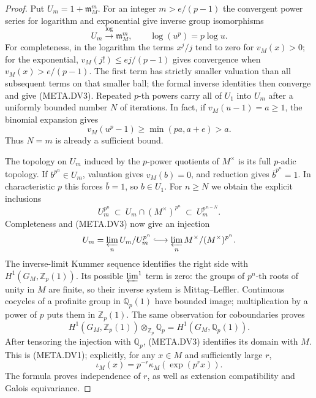 \begin{proof}
Put $U_m=1+\mathfrak m_M^m$.
For an integer $m>e/(p-1)$ the convergent power
series for logarithm and exponential give inverse
group isomorphisms
\[
             U_m\xrightarrow{\log}\mathfrak m_M^m,
                 \qquad\log(u^p)=p\log u.                    \tag{META.DV3}
\]
For completeness, in the logarithm the terms
$x^j/j$ tend to zero for $v_M(x)>0$; for the
exponential, $v_M(j!)\le ej/(p-1)$ gives convergence
when $v_M(x)>e/(p-1)$.
The first term has strictly smaller valuation
than all subsequent terms on that smaller ball;
the formal inverse identities then converge and
give (META.DV3).
Repeated $p$-th powers carry all of $U_1$ into
$U_m$ after a uniformly bounded number $N$ of
iterations.  In fact, if $v_M(u-1)=a\ge1$, the
binomial expansion gives
\[
                  v_M(u^p-1)\ge\min(pa,a+e)>a.
\]
Thus $N=m$ is already a sufficient bound.

The topology on $U_m$ induced by the $p$-power
quotients of $M^\times$ is its full $p$-adic topology.
If $b^{p^n}\in U_m$, valuation gives $v_M(b)=0$,
and reduction gives $\overline b^{p^n}=1$.
In characteristic $p$ this forces $\overline b=1$,
so $b\in U_1$.
For $n\ge N$ we obtain the explicit inclusions
\[
 U_m^{p^n}\ \subset\ U_m\cap(M^\times)^{p^n}
                 \ \subset\ U_m^{p^{\,n-N}}.                 \tag{META.DV4}
\]
Completeness and (META.DV3) now give an injection
\[
 U_m=\varprojlim_n U_m/U_m^{p^n}
       \lhook\joinrel\longrightarrow
             \varprojlim_n M^\times/(M^\times)^{p^n}.
\]
The inverse-limit Kummer sequence identifies the
right side with $H^1(G_M,\mathbb Z_p(1))$.
Its possible $\varprojlim^1$ term is zero:
the groups of $p^n$-th roots of unity in $M$ are
finite, so their inverse system is Mittag--Leffler.
Continuous cocycles of a profinite group in
$\mathbb Q_p(1)$ have bounded image; multiplication
by a power of $p$ puts them in $\mathbb Z_p(1)$.
The same observation for coboundaries proves
\[
 H^1(G_M,\mathbb Z_p(1))\otimes_{\mathbb Z_p}\mathbb Q_p
                         =H^1(G_M,\mathbb Q_p(1)).
\]
After tensoring the injection with $\mathbb Q_p$,
(META.DV3) identifies its domain with $M$.
This is (META.DV1); explicitly, for any $x\in M$
and sufficiently large $r$,
\[
                \iota_M(x)=p^{-r}\kappa_M(\exp(p^rx)).
\]
The formula proves independence of $r$, as well
as extension compatibility and Galois equivariance.


\end{proof}
